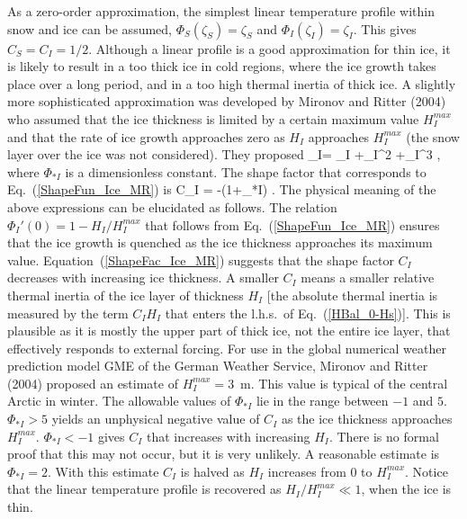 %
As a zero-order approximation,
the simplest linear temperature profile within snow and ice can be assumed,
$\Phi_S(\zeta_S)=\zeta_S$ and $\Phi_I(\zeta_I)=\zeta_I$.
This gives $C_{S}=C_{I}=1/2$. 
Although a linear profile is a good approximation for thin ice,
it is likely to result in a too thick ice in cold regions,
where the ice growth takes place over a long period,
and in a too high thermal inertia of thick ice.
A slightly more sophisticated
approximation was developed by Mironov and Ritter (2004) who assumed
that the ice thickness is limited by a certain maximum value $H_{I}^{max}$
and that the rate of ice growth approaches zero as $H_I$ approaches $H_{I}^{max}$
(the snow layer over the ice was not considered).
They proposed
%
\beq\label{ShapeFun_Ice_MR}
\Phi_I=
\zeta_I
+\zeta_I^2
+\zeta_I^3 ,
\eeq
%
where $\Phi_{*I}$ is a dimensionless constant.
The shape factor that corresponds to Eq.~(\ref{ShapeFun_Ice_MR}) is  
%
\beq\label{ShapeFac_Ice_MR}
C_{I} = -(1+\Phi_{*I}) .
\eeq
%
The physical meaning of the above expressions can be elucidated as follows.
The relation $\Phi_I'(0)=1-{H_I}/{H_{I}^{max}}$
that follows from Eq.~(\ref{ShapeFun_Ice_MR}) ensures that
the ice growth is quenched as the ice thickness approaches its maximum value.
Equation~(\ref{ShapeFac_Ice_MR}) suggests that
the shape factor $C_{I}$ decreases with increasing ice thickness.
A smaller $C_{I}$ means a smaller relative thermal inertia
of the ice layer of thickness $H_I$
[the absolute thermal inertia is measured by the term
$C_{I}H_I$ that enters the l.h.s.\ of Eq.~(\ref{HBal_0-Hs})].
This is plausible as it is mostly the upper part of thick ice,
not the entire ice layer, that effectively responds to external forcing.
For use in the global numerical weather prediction model GME
of the German Weather Service, Mironov and Ritter (2004) proposed
an estimate of $H_{I}^{max}=3$~m.
This value is typical of the central Arctic in winter.
The allowable values of $\Phi_{*I}$ lie in the range between $-1$ and $5$.
$\Phi_{*I}>5$ yields an unphysical negative value of $C_{I}$
as the ice thickness approaches $H_{I}^{max}$.
$\Phi_{*I}<-1$ gives $C_{I}$ that increases with increasing $H_I$.
There is no formal proof that this may not occur, but it is very unlikely.
A reasonable estimate is $\Phi_{*I}=2$. With this estimate $C_{I}$ is halved
as $H_I$ increases from 0 to $H_{I}^{max}$.
Notice that the linear temperature profile
is recovered as $H_I/H_{I}^{max}\ll1$, \ie when the ice is thin.

